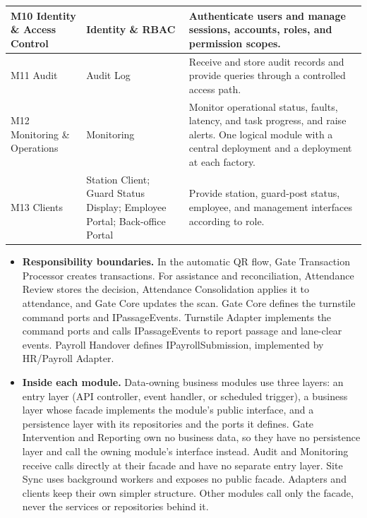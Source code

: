 \begin{longtable}{|>{\raggedright\arraybackslash}p{73.5pt}|>{\raggedright\arraybackslash}p{129.5pt}|>{\raggedright\arraybackslash}p{206.5pt}|}
\hline
M10 Identity \& Access Control & Identity \& RBAC & Authenticate users and manage sessions, accounts, roles, and permission scopes. \\
\hline
M11 Audit & Audit Log & Receive and store audit records and provide queries through a controlled access path. \\
\hline
M12 Monitoring \& Operations & Monitoring & Monitor operational status, faults, latency, and task progress, and raise alerts. One logical module with a central deployment and a deployment at each factory. \\*
\hline\noalign{\nobreak}
M13 Clients & Station Client; Guard Status Display; Employee Portal; Back-office Portal & Provide station, guard-post status, employee, and management interfaces according to role. \\
\hline
\end{longtable}


\begin{itemize}[leftmargin=36pt, itemsep=2pt, topsep=4pt, parsep=2pt]
  \item \textbf{Responsibility boundaries.} In the automatic QR flow, Gate Transaction Processor creates transactions. For assistance and reconciliation, Attendance Review stores the decision, Attendance Consolidation applies it to attendance, and Gate Core updates the scan. Gate Core defines the turnstile command ports and IPassageEvents. Turnstile Adapter implements the command ports and calls IPassageEvents to report passage and lane-clear events. Payroll Handover defines IPayrollSubmission, implemented by HR/Payroll Adapter.
  \item \textbf{Inside each module.} Data-owning business modules use three layers: an entry layer (API controller, event handler, or scheduled trigger), a business layer whose facade implements the module's public interface, and a persistence layer with its repositories and the ports it defines. Gate Intervention and Reporting own no business data, so they have no persistence layer and call the owning module's interface instead. Audit and Monitoring receive calls directly at their facade and have no separate entry layer. Site Sync uses background workers and exposes no public facade. Adapters and clients keep their own simpler structure. Other modules call only the facade, never the services or repositories behind it.
\end{itemize}

